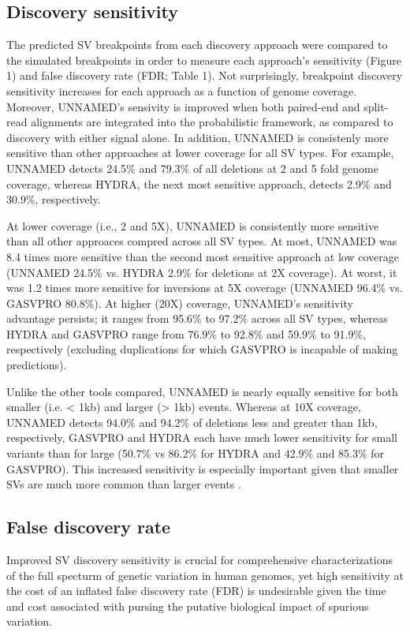 \documentclass[11pt]{article}
\begin{document}
\subsection{Discovery sensitivity}
The predicted SV breakpoints from each discovery approach were compared to the
simulated breakpoints in order to measure each approach's sensitivity (Figure 1) 
and false discovery rate (FDR; Table 1). Not surprisingly, breakpoint discovery
sensitivity increases for each approach as a function of genome coverage.
Moreover, UNNAMED's sensivity is improved when both paired-end and split-read
alignments are integrated into the probabilistic framework, as compared to 
discovery with either signal alone. In addition, UNNAMED is consistenly more
sensitive than other approaches at lower coverage for all SV types. For example,
UNNAMED detects 24.5\% and 79.3\% of all deletions at 2 and 5 fold genome
coverage, whereas HYDRA, the next most sensitive approach, detects 2.9\% and
30.9\%, respectively. 

At lower coverage (i.e., 2 and 5X), UNNAMED is consistently more sensitive 
than all other approaces compred across all SV types. At most, UNNAMED was 
8.4 times more sensitive than the second most
sensitive approach at low coverage (UNNAMED 24.5\% vs. HYDRA 2.9\% for deletions
at 2X coverage). At worst, it was 1.2 times more sensitive for inversions at
5X coverage (UNNAMED 96.4\% vs. GASVPRO 80.8\%). At higher (20X) coverage, 
UNNAMED's sensitivity advantage persists; it ranges from 95.6\% to 97.2\% 
across all SV types, whereas HYDRA and GASVPRO range from 76.9\% to 92.8\% and
59.9\% to 91.9\%, respectively (excluding duplications for which GASVPRO is
incapable of making predictions).

Unlike the other tools compared, UNNAMED is nearly equally sensitive for 
both smaller (i.e. < 1kb) and larger (> 1kb) events. Whereas at 10X coverage,
UNNAMED detects 94.0\% and 94.2\% of deletions less and greater than 1kb, 
respectively, GASVPRO and HYDRA each have much lower sensitivity for small
variants than for large (50.7\% vs 86.2\% for HYDRA and 42.9\% and 85.3\% for
GASVPRO). This increased sensitivity is especially important given that smaller
SVs are much more common than larger events \cite{mills2011}.


\subsection{False discovery rate}
Improved SV discovery sensitivity is crucial for comprehensive characterizations
of the full specturm of genetic variation in human genomes, yet high
sensitivity at the cost of an inflated false discovery rate (FDR) is
undesirable given the time and cost associated with pursing
the putative biological impact of spurious variation.
\end{document}
